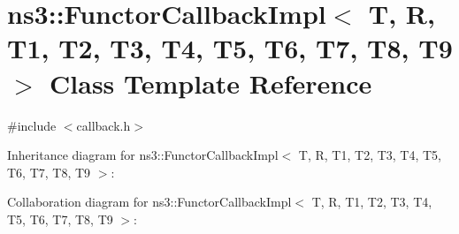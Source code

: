 \hypertarget{classns3_1_1FunctorCallbackImpl}{}\section{ns3\+:\+:Functor\+Callback\+Impl$<$ T, R, T1, T2, T3, T4, T5, T6, T7, T8, T9 $>$ Class Template Reference}
\label{classns3_1_1FunctorCallbackImpl}


{\ttfamily \#include $<$callback.\+h$>$}



Inheritance diagram for ns3\+:\+:Functor\+Callback\+Impl$<$ T, R, T1, T2, T3, T4, T5, T6, T7, T8, T9 $>$\+:


Collaboration diagram for ns3\+:\+:Functor\+Callback\+Impl$<$ T, R, T1, T2, T3, T4, T5, T6, T7, T8, T9 $>$\+:
